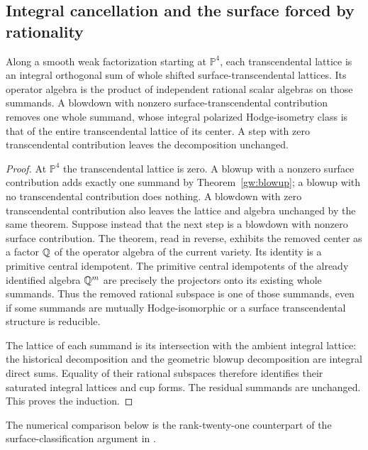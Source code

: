 \subsection{Integral cancellation and the surface forced by rationality}

\begin{lemma}\label{gw:blocks}
Along a smooth weak factorization starting at $\mathbb P^4$, each
transcendental lattice is an integral orthogonal sum of whole shifted
surface-transcendental lattices.  Its operator algebra is the product of
independent rational scalar algebras on those summands.  A blowdown with
nonzero surface-transcendental contribution removes one whole summand,
whose integral polarized Hodge-isometry class is that of the entire
transcendental lattice of its center.  A step with zero transcendental
contribution leaves the decomposition unchanged.
\end{lemma}
\begin{proof}
At $\mathbb P^4$ the transcendental lattice is zero.  A blowup with a
nonzero surface contribution adds exactly one summand by
Theorem~\ref{gw:blowup}; a blowup with no transcendental contribution does
nothing.  A blowdown with zero transcendental contribution also leaves the
lattice and algebra unchanged by the same theorem.  Suppose instead that
the next step is a blowdown with nonzero surface contribution.  The theorem,
read in reverse, exhibits the removed center as a factor $\mathbb Q$ of
the operator algebra of the current variety.  Its identity is a primitive
central idempotent.  The primitive central idempotents of the already
identified algebra $\mathbb Q^m$ are precisely the projectors onto its existing
whole summands.  Thus the removed rational subspace is one of those
summands, even if some summands are mutually Hodge-isomorphic or a surface
transcendental structure is reducible.

The lattice of each summand is its intersection with the ambient integral
lattice: the historical decomposition and the geometric blowup decomposition
are integral direct sums.  Equality of their rational subspaces therefore
identifies their saturated integral lattices and cup forms.  The residual
summands are unchanged.  This proves the induction.
\end{proof}

The numerical comparison below is the rank-twenty-one counterpart of
the surface-classification argument in \cite[Lemma~3]{Kulikov08}.

